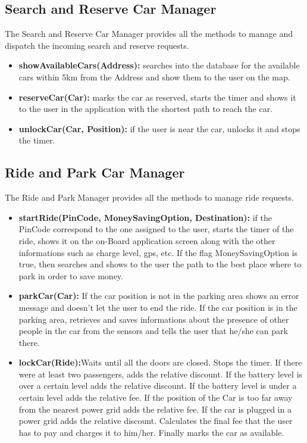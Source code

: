 \newcommand\tab[1][1cm]{\hspace*{#1}}

\subsection{Search and Reserve Car Manager}
The Search and Reserve Car Manager provides all the methods to manage and dispatch the incoming search and reserve requests.\\
\begin{itemize}
\item \textbf{showAvailableCars(Address):} searches into the database for the available cars within 5km from the Address and show them to the user on the map.

\item \textbf{reserveCar(Car):} marks the car as reserved, starts the timer and shows it to the user in the application with the shortest path to reach the car.

\item \textbf{unlockCar(Car, Position):} if the user is near the car, unlocks it and stops the timer.
\end{itemize}
\subsection{Ride and Park Car Manager}
The Ride and Park Manager provides all the methods to manage ride requests.\\
\begin{itemize}
\item \textbf{startRide(PinCode, MoneySavingOption, Destination):} if the PinCode correspond to the one assigned to the user, starts the timer of the ride, shows it on the on-Board application screen along with the other informations such as charge level, gps, etc. If the flag MoneySavingOption is true, then searches and shows to the user the path to the best place where to park in order to save money.

\item \textbf{parkCar(Car):} If the car position is not in the parking area shows an error message and doesn't let the user to end the ride. If the car position is in the parking area, retrieves and saves informations about the presence of other people in the car from the sensors and tells the user that he/she can park there.

\item \textbf{lockCar(Ride):}Waits until all the doors are closed. Stops the timer. If there were at least two passengers, adds the relative discount. If the battery level is over a certain level adds the relative discount. If the battery level is under a certain level adds the relative fee. If the position of the Car is too far away from the nearest power grid adds the relative fee. If the car is plugged in a power grid adds the relative discount. Calculates the final fee that the user has to pay and charges it to him/her. Finally marks the car as available.
\end{itemize}

